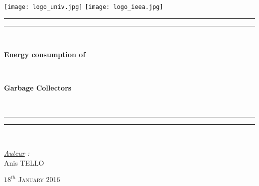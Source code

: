 \thispagestyle{cover}

\texttt{[image: logo\_univ.jpg]}
 \hfill \texttt{[image: logo\_ieea.jpg]} \\

\vspace*{15mm}

\begin{center}

	\vspace*{15mm}

	\rule[0.5ex]{\linewidth}{2pt}\vspace*{-\baselineskip}\vspace*{3.2pt}
	\rule[0.5ex]{\linewidth}{1pt}\\[\baselineskip]

		\begin{Huge} \textbf{Energy consumption of} \end{Huge}\\[4mm]
		\begin{Huge} \textbf{Garbage Collectors} \end{Huge}\\[4mm]
	\rule[0.5ex]{\linewidth}{1pt}\vspace*{-\baselineskip}\vspace{3.2pt}
	\rule[0.5ex]{\linewidth}{2pt}\\

	\vspace*{20mm}

	{\LARGE \textit{\underline{Auteur} :}}\\
	\vspace*{3mm}
	{\LARGE Anis TELLO}\\
	
	\vspace*{20mm}
	
	{\LARGE\textsc{$18^{th}$ January 2016}}
\end{center}